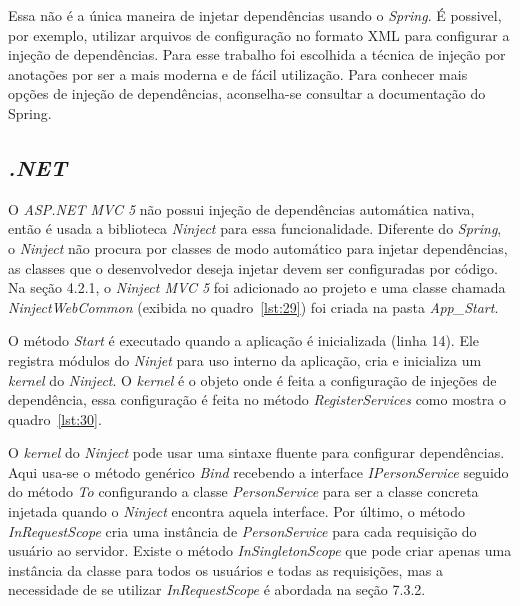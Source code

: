 Essa não é a única maneira de injetar dependências usando o \textit{Spring}. É possivel, por exemplo, utilizar arquivos de configuração no formato XML para configurar a injeção de dependências. Para esse trabalho foi escolhida a técnica de injeção por anotações por ser a mais moderna e de fácil utilização. Para conhecer mais opções de injeção de dependências, aconselha-se consultar a documentação do Spring.

\subsection{\textit{.NET}}

O \textit{ASP.NET MVC 5} não possui injeção de dependências automática nativa, então é usada a biblioteca \textit{Ninject} para essa funcionalidade. Diferente do \textit{Spring}, o \textit{Ninject} não procura por classes de modo automático para injetar dependências, as classes que o desenvolvedor deseja injetar devem ser configuradas por código. Na seção 4.2.1, o \textit{Ninject MVC 5} foi adicionado ao projeto e uma classe chamada \textit{NinjectWebCommon} (exibida no quadro~\ref{lst:29}) foi criada na pasta \textit{App\_Start}. 


O método \textit{Start} é executado quando a aplicação é inicializada (linha 14). Ele registra módulos do \textit{Ninjet} para uso interno da aplicação, cria e inicializa um \textit{kernel} do \textit{Ninject}. O \textit{kernel} é o objeto onde é feita a configuração de injeções de dependência, essa configuração é feita no método \textit{RegisterServices} como mostra o quadro~\ref{lst:30}.


O \textit{kernel} do \textit{Ninject} pode usar uma sintaxe fluente para configurar dependências. Aqui usa-se o método genérico \textit{Bind} recebendo a interface \textit{IPersonService} seguido do método \textit{To} configurando a classe \textit{PersonService} para ser a classe concreta injetada quando o \textit{Ninject} encontra aquela interface. Por último, o método \textit{InRequestScope} cria uma instância de \textit{PersonService} para cada requisição do usuário ao servidor. Existe o método \textit{InSingletonScope} que pode criar apenas uma instância da classe para todos os usuários e todas as requisições, mas a necessidade de se utilizar \textit{InRequestScope} é abordada na seção 7.3.2.

